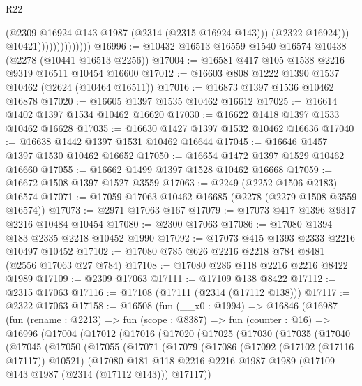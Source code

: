 \begin{lexlean}{R22}
\begin{coremodule}
                                    (@2309 @16924 @143 @1987 (@2314 (@2315 @16924 @143)))
                                    (@2322 @16924)))
                                @10421))))))))))))))
@16996 := @10432 @16513 @16559 @1540 @16574 @10438 (@2278 (@10441 @16513 @2256))
@17004 := @16581 @417 @105 @1538 @2216 @9319 @16511 @10454 @16600
@17012 := @16603 @808 @1222 @1390 @1537 @10462 (@2624 (@10464 @16511))
@17016 := @16873 @1397 @1536 @10462 @16878
@17020 := @16605 @1397 @1535 @10462 @16612
@17025 := @16614 @1402 @1397 @1534 @10462 @16620
@17030 := @16622 @1418 @1397 @1533 @10462 @16628
@17035 := @16630 @1427 @1397 @1532 @10462 @16636
@17040 := @16638 @1442 @1397 @1531 @10462 @16644
@17045 := @16646 @1457 @1397 @1530 @10462 @16652
@17050 := @16654 @1472 @1397 @1529 @10462 @16660
@17055 := @16662 @1499 @1397 @1528 @10462 @16668
@17059 := @16672 @1508 @1397 @1527 @3559
@17063 := @2249 (@2252 @1506 @2183) @16574
@17071 := @17059 @17063 @10462 @16685 (@2278 (@2279 @1508 @3559 @16574))
@17073 := @2971 @17063 @167
@17079 := @17073 @417 @1396 @9317 @2216 @10484 @10454
@17080 := @2300 @17063
@17086 := @17080 @1394 @183 @2335 @2218 @10452 @1990
@17092 := @17073 @415 @1393 @2333 @2216 @10497 @10452
@17102 := @17080 @785 @626 @2216 @2218 @784 @8481 (@2556 @17063 @27 @784)
@17108 := @17080 @286 @118 @2216 @2216 @8422 @1989
@17109 := @2309 @17063
@17111 := @17109 @138 @8422
@17112 := @2315 @17063
@17116 := @17108 (@17111 (@2314 (@17112 @138)))
@17117 := @2322 @17063
@17158 := @16508
    (fun (__x0 : @1994) =>
    @16846
      (@16987
        (fun (rename : @2213) =>
        fun (scope : @8387) =>
        fun (counter : @16) =>
        @16996
          (@17004
            (@17012
              (@17016
                (@17020
                  (@17025
                    (@17030
                      (@17035
                        (@17040
                          (@17045
                            (@17050
                              (@17055
                                (@17071
                                  (@17079
                                    (@17086
                                      (@17092 (@17102 (@17116 @17117)) @10521)
                                      (@17080
                                        @181
                                        @118
                                        @2216
                                        @2216
                                        @1987
                                        @1989
                                        (@17109 @143 @1987 (@2314 (@17112 @143)))
                                        @17117))

\end{coremodule}
\end{lexlean}
